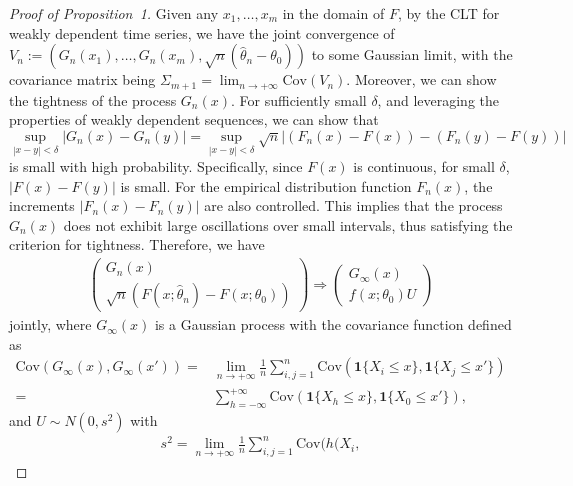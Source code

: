 \documentclass[12pt]{article}
\begin{document}
\begin{proof}[Proof of Proposition~1]
Given any $x_1,\dots,x_m$ in the domain of $F$, by the CLT for weakly dependent 
time series, we have the joint convergence of 
$V_n:=(G_n(x_1),\dots,G_n(x_m),\sqrt{n}(\hat{\theta}_n-\theta_0))$
to some Gaussian limit, with the covariance matrix being 
$\Sigma_{m+1}=\lim_{n\rightarrow+\infty}\text{Cov}(V_n)$.
Moreover, we can show the tightness of the process $G_n(x)$. 
For sufficiently small $\delta$, and leveraging the properties of weakly 
dependent sequences, we can show that
\[ \sup_{|x - y| < \delta} |G_n(x) - G_n(y)| = \sup_{|x - y| < \delta} 
\sqrt{n}|(F_n(x) - F(x)) - (F_n(y) - F(y))| \]
is small with high probability.
Specifically, since $F(x)$ is continuous, for small 
$\delta$, $|F(x) - F(y)|$ is small. For the empirical 
distribution function $F_n(x)$, the increments $|F_n(x) - F_n(y)|$ are 
also controlled. 
This implies that the process $G_n(x)$ does not exhibit large oscillations over 
small intervals, thus satisfying the criterion for tightness.
Therefore, we have
\begin{align*}
\begin{pmatrix}
G_n(x)  \\ 
\sqrt{n}(F(x;\hat{\theta}_n)-F(x;\theta_0))
\end{pmatrix}\Rightarrow
\begin{pmatrix}
G_{\infty}(x) \\
f(x;\theta_0)U
\end{pmatrix}
\end{align*}
jointly, where $G_{\infty}(x)$ is a Gaussian process with the covariance 
function defined as
\begin{align*}
\text{Cov}(G_{\infty}(x),G_{\infty}(x'))=& 
\lim_{n\rightarrow+\infty}\frac{1}{n}\sum^{n}_{i,j=1}
\text{Cov}(\mathbf{1}\{X_i\leq x\},\mathbf{1}\{X_j\leq x'\})
\\=& \sum^{+\infty}_{h=-\infty}\text{Cov}(\mathbf{1}\{X_{h}\leq x\},
\mathbf{1}\{X_0\leq x'\}),
\end{align*}
and $U\sim N(0,s^2)$ with 
\begin{align*}
s^2=\lim_{n\rightarrow+\infty}\frac{1}{n}\sum^{n}_{i,j=1}\text{Cov}(h(X_i,

\end{align*}
\end{proof}
\end{document}
